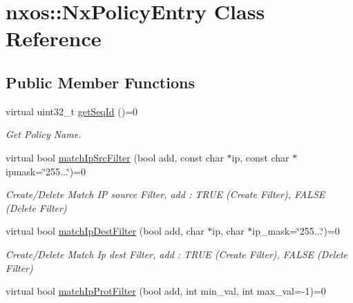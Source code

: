 \hypertarget{classnxos_1_1NxPolicyEntry}{\section{nxos\-:\-:Nx\-Policy\-Entry Class Reference}
\label{classnxos_1_1NxPolicyEntry}
}
\subsection*{Public Member Functions}
\begin{DoxyCompactItemize}
\item 
\hypertarget{classnxos_1_1NxPolicyEntry_aa83d2eedce90e574cbdbbc8a2f00fc73}{virtual uint32\-\_\-t \hyperlink{classnxos_1_1NxPolicyEntry_aa83d2eedce90e574cbdbbc8a2f00fc73}{get\-Seq\-Id} ()=0}\label{classnxos_1_1NxPolicyEntry_aa83d2eedce90e574cbdbbc8a2f00fc73}

\begin{DoxyCompactList}\small\item\em Get Policy Name. \end{DoxyCompactList}\item 
\hypertarget{classnxos_1_1NxPolicyEntry_abfe7c09520bbd436bf9f289597cb170e}{virtual bool \hyperlink{classnxos_1_1NxPolicyEntry_abfe7c09520bbd436bf9f289597cb170e}{match\-Ip\-Src\-Filter} (bool add, const char $\ast$ip, const char $\ast$ipmask=\char`\"{}255...\char`\"{})=0}\label{classnxos_1_1NxPolicyEntry_abfe7c09520bbd436bf9f289597cb170e}

\begin{DoxyCompactList}\small\item\em Create/\-Delete Match I\-P source Filter, add \-: T\-R\-U\-E (Create Filter), F\-A\-L\-S\-E (Delete Filter) \end{DoxyCompactList}\item 
\hypertarget{classnxos_1_1NxPolicyEntry_a664fe6dcebce6ece27b9ce4b860ffcb9}{virtual bool \hyperlink{classnxos_1_1NxPolicyEntry_a664fe6dcebce6ece27b9ce4b860ffcb9}{match\-Ip\-Dest\-Filter} (bool add, char $\ast$ip, char $\ast$ip\-\_\-mask=\char`\"{}255...\char`\"{})=0}\label{classnxos_1_1NxPolicyEntry_a664fe6dcebce6ece27b9ce4b860ffcb9}

\begin{DoxyCompactList}\small\item\em Create/\-Delete Match Ip dest Filter, add \-: T\-R\-U\-E (Create Filter), F\-A\-L\-S\-E (Delete Filter) \end{DoxyCompactList}\item 
\hypertarget{classnxos_1_1NxPolicyEntry_ab1af9afebbd7a1a949d10cd95b33a237}{virtual bool \hyperlink{classnxos_1_1NxPolicyEntry_ab1af9afebbd7a1a949d10cd95b33a237}{match\-Ip\-Prot\-Filter} (bool add, int min\-\_\-val, int max\-\_\-val=-\/1)=0}\label{classnxos_1_1NxPolicyEntry_ab1af9afebbd7a1a949d10cd95b33a237}


\end{DoxyCompactItemize}
